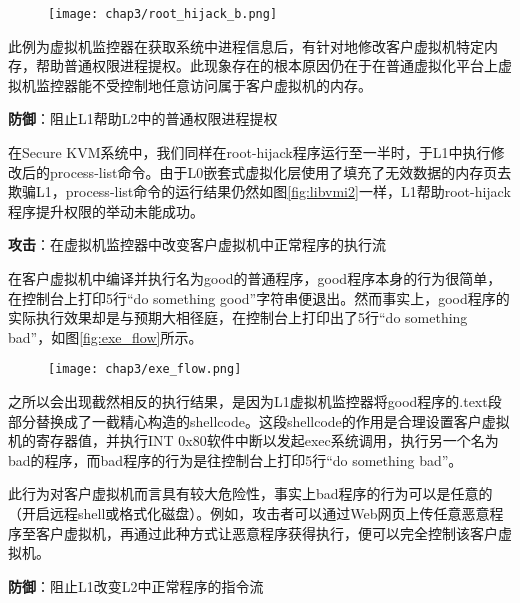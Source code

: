 \begin{figure}[!htbp]
  \centering
  \texttt{[image: chap3/root\_hijack\_b.png]}
\end{figure}

此例为虚拟机监控器在获取系统中进程信息后，有针对地修改客户虚拟机特定内存，帮助普通权限进程提权。此现象存在的根本原因仍在于在普通虚拟化平台上虚拟机监控器能不受控制地任意访问属于客户虚拟机的内存。

\noindent
\textbf{防御\uppercase\expandafter{}}：阻止L1帮助L2中的普通权限进程提权

在Secure KVM系统中，我们同样在root-hijack程序运行至一半时，于L1中执行修改后的process-list命令。由于L0嵌套式虚拟化层使用了填充了无效数据的内存页去欺骗L1，process-list命令的运行结果仍然如图\ref{fig:libvmi2}一样，L1帮助root-hijack程序提升权限的举动未能成功。

\noindent
\textbf{攻击\uppercase\expandafter{}}：在虚拟机监控器中改变客户虚拟机中正常程序的执行流

在客户虚拟机中编译并执行名为good的普通程序，good程序本身的行为很简单，在控制台上打印5行``do something good''字符串便退出。然而事实上，good程序的实际执行效果却是与预期大相径庭，在控制台上打印出了5行``do something bad''，如图\ref{fig:exe_flow}所示。

\begin{figure}[!htbp]
  \centering
  \texttt{[image: chap3/exe\_flow.png]}
\end{figure}

之所以会出现截然相反的执行结果，是因为L1虚拟机监控器将good程序的.text段部分替换成了一截精心构造的shellcode。这段shellcode的作用是合理设置客户虚拟机的寄存器值，并执行INT 0x80软件中断以发起exec系统调用，执行另一个名为bad的程序，而bad程序的行为是往控制台上打印5行``do something bad''。

此行为对客户虚拟机而言具有较大危险性，事实上bad程序的行为可以是任意的（开启远程shell或格式化磁盘）。例如，攻击者可以通过Web网页上传任意恶意程序至客户虚拟机，再通过此种方式让恶意程序获得执行，便可以完全控制该客户虚拟机。

\noindent
\textbf{防御\uppercase\expandafter{}}：阻止L1改变L2中正常程序的指令流

